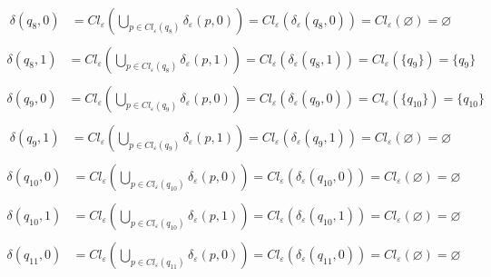 \documentclass{article}
\begin{document}
\begin{enumerate}
\begin{align*}
      \end{align*}
      \begin{align*}
        \delta(q_8, 0) &= Cl_{\varepsilon}(\bigcup_{p \in Cl_{\varepsilon}(q_8)} \delta_{\varepsilon}(p,0)) = Cl_\varepsilon(\delta_\varepsilon(q_8,0)) = Cl_\varepsilon(\varnothing) = \varnothing\\
      \end{align*}
      \begin{align*}
        \delta(q_8, 1) &= Cl_{\varepsilon}(\bigcup_{p \in Cl_{\varepsilon}(q_8)} \delta_{\varepsilon}(p,1)) = Cl_\varepsilon(\delta_\varepsilon(q_8,1)) = Cl_\varepsilon(\{q_9\}) = \{q_9\}\\
      \end{align*}
      \begin{align*}
        \delta(q_9, 0) &= Cl_{\varepsilon}(\bigcup_{p \in Cl_{\varepsilon}(q_9)} \delta_{\varepsilon}(p,0)) = Cl_\varepsilon(\delta_\varepsilon(q_9,0)) = Cl_\varepsilon(\{q_{10}\}) = \{q_{10}\}\\
      \end{align*}
      \begin{align*}
        \delta(q_9, 1) &= Cl_{\varepsilon}(\bigcup_{p \in Cl_{\varepsilon}(q_9)} \delta_{\varepsilon}(p,1)) = Cl_\varepsilon(\delta_\varepsilon(q_9,1)) = Cl_\varepsilon(\varnothing) = \varnothing\\
      \end{align*}
      \begin{align*}
        \delta(q_{10}, 0) &= Cl_{\varepsilon}(\bigcup_{p \in Cl_{\varepsilon}(q_{10})} \delta_{\varepsilon}(p,0)) = Cl_\varepsilon(\delta_\varepsilon(q_{10},0)) = Cl_\varepsilon(\varnothing) = \varnothing\\
      \end{align*}
      \begin{align*}
        \delta(q_{10}, 1) &= Cl_{\varepsilon}(\bigcup_{p \in Cl_{\varepsilon}(q_{10})} \delta_{\varepsilon}(p,1)) = Cl_\varepsilon(\delta_\varepsilon(q_{10},1)) = Cl_\varepsilon(\varnothing) = \varnothing\\
      \end{align*}
      \begin{align*}
        \delta(q_{11}, 0) &= Cl_{\varepsilon}(\bigcup_{p \in Cl_{\varepsilon}(q_{11})} \delta_{\varepsilon}(p,0)) = Cl_\varepsilon(\delta_\varepsilon(q_{11},0)) = Cl_\varepsilon(\varnothing) = \varnothing\\
      \end{align*}
      \begin{align*}

\end{align*}
\end{enumerate}
\end{document}
